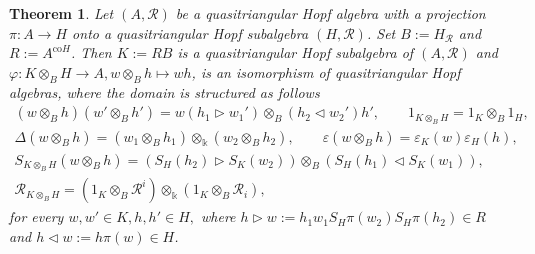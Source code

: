 \documentclass[nosumlimits,twoside]{amsart}
\newtheorem{theorem}{\sc Theorem}[section]
\theoremstyle{definition}
\theoremstyle{remark}
\newcommand{\rd}[1]{{\color{red}{#1}}}
\newcommand{\Rr}{\mathcal{R}}
\begin{document}
\begin{theorem}%
\label{thm:crospt}
 Let $(A,\Rr)$ be a quasitriangular Hopf algebra with a projection $\pi:A\to H$ onto a quasitriangular Hopf subalgebra $(H,\Rr)$. Set $B:=H_{\Rr}$ and $R:=A^{\mathrm{co}H}$. Then $K:=RB$ is a quasitriangular Hopf subalgebra of $(A,\Rr)$ and $\varphi:K\otimes_B H\to A,w\otimes_B h\mapsto wh$, is an isomorphism of quasitriangular Hopf algebras, where the domain is structured as follows
 \begin{gather*}\label{structures}
 (w\otimes_B h)(w'\otimes_B h')=w (h_1\triangleright w_1')\otimes_B (h_2\triangleleft w_2') h',\qquad 1_{K\otimes_B H}=1_K\otimes_B1_H,\\
 \Delta(w\otimes_B h)=(w_1\otimes_B h_1)\otimes_\Bbbk (w_2\otimes_B h_2),\qquad \varepsilon(w\otimes_B h)=\varepsilon_K(w)\varepsilon_H(h),\\
 S_{K\otimes_B H}(w\otimes_B h)=(S_H(h_2)\triangleright S_K(w_2))\otimes_B (S_H(h_1)\triangleleft S_K(w_1)),\\ \Rr_{K\otimes_B H}=(1_K\otimes_B \Rr^i)\otimes_\Bbbk(1_K\otimes_B\Rr_i),
 \end{gather*}
 for every $w,w'\in K,h,h'\in H,$ where $h\triangleright w:=h_1w_1S_H\pi(w_2)S_H\pi(h_2)\in R$ and
 $h\triangleleft w:=h\pi(w)\in H$.
\end{theorem}
\end{document}
